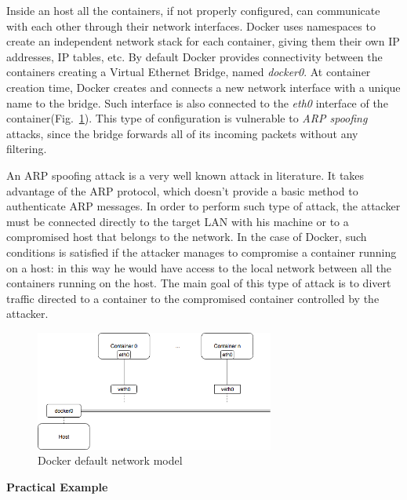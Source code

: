 \documentclass[a4paper,12pt]{article}
\def\myfig#1{Fig.~#1\xspace}
\begin{document}
Inside an host all the containers, if not properly configured, can communicate
with each other through their network interfaces. Docker uses namespaces to
create an independent network stack for each container, giving them their own IP
addresses, IP tables, etc. By default Docker provides connectivity between the
containers creating a Virtual Ethernet Bridge, named \textit{docker0}. At
container creation time, Docker creates and connects a new network interface with
a unique name to the bridge. Such interface is also connected to the
\textit{eth0} interface of the
container(\myfig{\ref{fig:docker_network_model}}). This type of configuration is
vulnerable to \textit{ARP spoofing} attacks, since the bridge forwards all of
its incoming packets without any filtering. \par An ARP spoofing attack is a
very well known attack in literature. It takes advantage of the ARP protocol,
which doesn't provide a basic method to authenticate ARP messages. In order to
perform such type of attack, the attacker must be connected directly to the
target LAN with his machine or to a compromised host that belongs to the
network. In the case of Docker, such conditions is satisfied if the attacker
manages to compromise a container running on a host: in this way he would have
access to the local network between all the containers running on the host. The
main goal of this type of attack is to divert traffic directed to a container to
the compromised container controlled by the attacker.   
\begin{figure}[ht!]
  \centerline{\includegraphics[width=0.7\textwidth]{docker-network-model.png}}
  \caption{Docker default network model}
  \label{fig:docker_network_model}
  \end{figure}

\bigbreak\textbf{Practical Example}\bigbreak 
\end{document}
